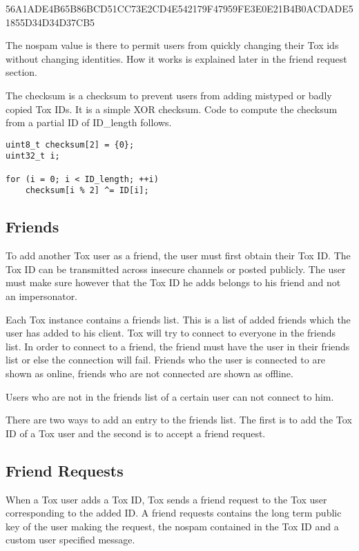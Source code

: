 \documentclass{tox}
\begin{document}
56A1ADE4B65B86BCD51CC73E2CD4E542179F47959FE3E0E21B4B0ACDADE51855D34D34D37CB5

The nospam value is there to permit users from quickly changing their Tox ids 
without changing identities. How it works is explained later in the friend 
request section.

The checksum is a checksum to prevent users from adding mistyped or badly 
copied Tox IDs. It is a simple XOR checksum. Code to compute the checksum from 
a partial ID of ID\_length follows.

\begin{lstlisting}
uint8_t checksum[2] = {0};
uint32_t i;

for (i = 0; i < ID_length; ++i)
    checksum[i % 2] ^= ID[i];

\end{lstlisting}

\subsection{Friends}

To add another Tox user as a friend, the user must first obtain their Tox ID. 
The Tox ID can be transmitted across insecure channels or posted publicly. The 
user must make sure however that the Tox ID he adds belongs to his friend and 
not an impersonator.

Each Tox instance contains a friends list. This is a list of added friends 
which the user has added to his client. Tox will try to connect to everyone in 
the friends list. In order to connect to a friend, the friend must have the 
user in their friends list or else the connection will fail. Friends who the 
user is connected to are shown as online, friends who are not connected are 
shown as offline.

Users who are not in the friends list of a certain user can not connect to him.

There are two ways to add an entry to the friends list. The first is to add the 
Tox ID of a Tox user and the second is to accept a friend request.

\subsection{Friend Requests}

When a Tox user adds a Tox ID, Tox sends a friend request to the Tox user 
corresponding to the added ID. A friend requests contains the long term public 
key of the user making the request, the nospam contained in the Tox ID and a 
custom user specified message.
\end{document}
